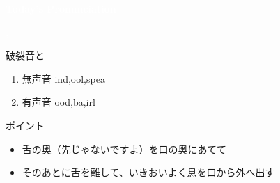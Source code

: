 \documentclass[aspectratio=169,xcolor={dvipsnames,table}]{beamer}
\begin{document}
\begin{frame}
\centering
  \textcolor{white}{\Huge\bfseries Today's Pronunciation}\pause

 \vspace{30pt}

  \textcolor{white}{\Huge\bfseries {}, }
\end{frame}
\begin{frame}[plain]{破裂音と}

\large

\begin{enumerate}
 \item  無声音 \hspace{20pt}ind,\hspace{1\zw}ool,\hspace{1\zw}spea
 \item  有声音 \hspace{20pt}ood,\hspace{1\zw}ba,\hspace{1\zw}irl
\end{enumerate}


\vspace*{20pt}

\normalsize
ポイント

\begin{itemize}
 \item 舌の奥（先じゃないですよ）を口の奥にあてて
 \item そのあとに舌を離して、いきおいよく息を口から外へ出す
\end{itemize}

\hfill{}
\end{frame}
\end{document}
